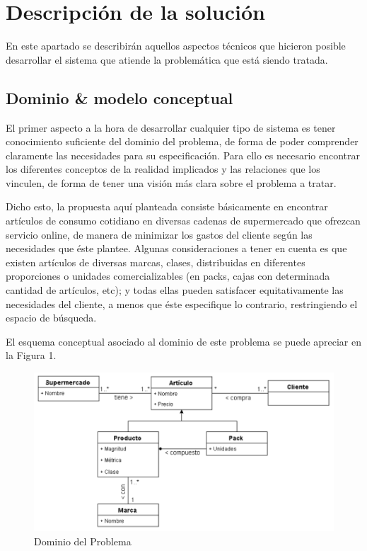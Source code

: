 \documentclass[12pt]{article} %
\begin{document}

\section{Descripción de la solución}

En este apartado se describirán aquellos aspectos técnicos que hicieron posible desarrollar el sistema que atiende la problemática que está siendo tratada.


\subsection{Dominio \& modelo conceptual} 

El primer aspecto a la hora de desarrollar cualquier tipo de sistema es tener conocimiento suficiente del dominio del problema, de forma de poder comprender claramente las necesidades para su especificación. Para ello es necesario encontrar los diferentes conceptos de la realidad implicados y las relaciones que los vinculen, de forma de tener una visión más clara sobre el problema a tratar.

Dicho esto, la propuesta aquí planteada consiste básicamente en encontrar artículos de consumo cotidiano en diversas cadenas de supermercado que ofrezcan servicio online, de manera de minimizar los gastos del cliente según las necesidades que éste plantee. Algunas consideraciones a tener en cuenta es que existen artículos de diversas marcas, clases, distribuidas en diferentes proporciones o unidades comercializables (en packs, cajas con determinada cantidad de artículos, etc); y todas ellas pueden satisfacer equitativamente las necesidades del cliente, a menos que éste especifique lo contrario, restringiendo el espacio de búsqueda.

El esquema conceptual asociado al dominio de este problema se puede apreciar en la Figura 1.

\begin{figure}
\includegraphics[scale=1]{dominio}
\centering
\caption{Dominio del Problema}
\end{figure}
\end{document}
